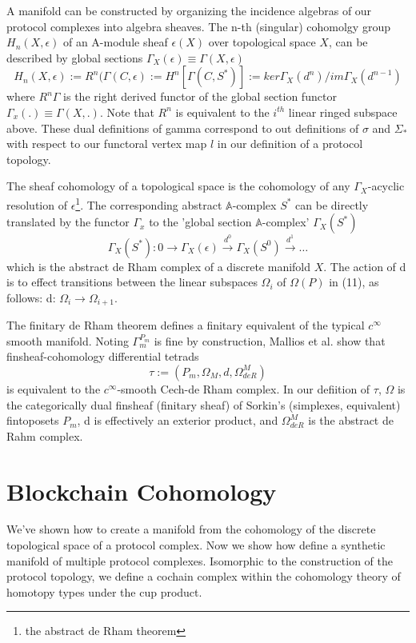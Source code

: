 \documentclass{article}
\begin{document}
A manifold can be constructed by organizing the incidence algebras of our protocol complexes into algebra sheaves. The n-th (singular) cohomolgy group $H_n(X, \epsilon)$ of an A-module sheaf $\epsilon(X)$ over topological space $X$, can be described by global sections $\Gamma_X(\epsilon) \equiv \Gamma (X, \epsilon)$
\begin{equation} \label{eq1}
H_n(X, \epsilon) := R^n(\Gamma(C,\epsilon) := H^n[\Gamma(C, S^*)] := ker\Gamma_X(d^n)/im\Gamma_X(d^{n-1})
\end{equation} \label{eq1}
where $R^n\Gamma$ is the right derived functor of the global section functor $\Gamma_x(.) \equiv \Gamma(X,.)$. Note that $R^n$ is equivalent to the $i^{th}$ linear ringed subspace above. These dual definitions of gamma correspond to out definitions of $\sigma$ and $\Sigma_*$ with respect to our functoral vertex map $l$ in our definition of a protocol topology.

The sheaf cohomology of a topological space is the cohomology of any $\Gamma_X$-acyclic resolution of $\epsilon$\footnote{the abstract de Rham theorem}. The corresponding abstract $\mathbb{A}$-complex $S^*$ can be directly translated by the functor $\Gamma_x$ to the 'global section $\mathbb{A}$-complex' $\Gamma_X(S^*)$
\begin{equation} \label{eq1}
\Gamma_X(S^*):  0 \xrightarrow{~} \Gamma_X(\epsilon) \xrightarrow{d^0} \Gamma_X(S^0) \xrightarrow{d^1} \dots
\end{equation} \label{eq1}
which is the abstract de Rham complex of a discrete manifold $X$. The action of d is to effect transitions between the linear subspaces $\Omega_i$ of $\Omega(P)$ in (11), as follows: d: $\Omega_i \rightarrow \Omega_{i+1}$.

The finitary de Rham theorem defines a finitary equivalent of the typical $c^{\infty}$ smooth manifold. Noting $\Gamma^{P_m}_m$ is fine by construction, Mallios et al. show that finsheaf-cohomology differential tetrads
\begin{equation} \label{eq1}
\tau := (P_m, \Omega_M, d, \Omega^M_{deR})
\end{equation} \label{eq1}
is equivalent to the $c^{\infty}$-smooth Cech-de Rham complex. In our defiition of $\tau$, $\Omega$ is the categorically dual finsheaf (finitary sheaf) of Sorkin's (simplexes, equivalent) fintoposets $P_m$, d is effectively an exterior product, and $ \Omega^M_{deR}$ is the abstract de Rahm complex.

\section{Blockchain Cohomology}
We've shown how to create a manifold from the cohomology of the discrete topological space of a protocol complex. Now we show how define a synthetic manifold of multiple protocol complexes. Isomorphic to the construction of the protocol topology, we define a cochain complex within the cohomology theory of homotopy types under the cup product.
\end{document}
